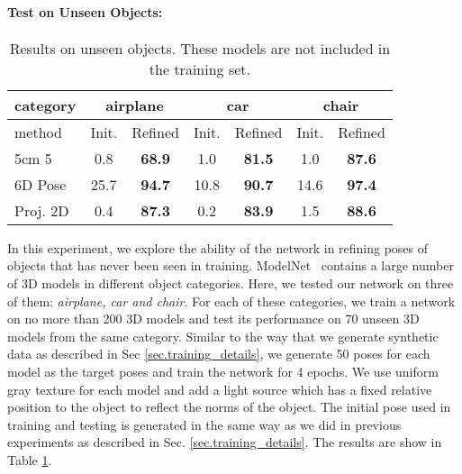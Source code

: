 \documentclass[twocolumn]{svjour3}
\begin{document}
\paragraph{Test on Unseen Objects:}

\begin{table}
\centering
\caption{Results on unseen objects. These models are not included in the training set.}
\small
\begin{tabular}{l|c|c|c|c|c|c}
\hline
category & \multicolumn{2}{c|}{airplane}& \multicolumn{2}{c|}{car}& \multicolumn{2}{c}{chair}\\
\hline
method  & Init. & Refined & Init. & Refined &Init. & Refined\\
\hline
5cm 5\degree	& 0.8 & \textbf{68.9} & 1.0 	& \textbf{81.5} & 1.0 	& \textbf{87.6} \\
6D Pose  & 25.7  & \textbf{94.7} & 10.8	& \textbf{90.7} & 14.6 & \textbf{97.4} \\
Proj. 2D & 0.4 & \textbf{87.3} & 0.2 	& \textbf{83.9} & 1.5	& \textbf{88.6} \\
\hline
\end{tabular}
\label{table.unseen_objects}
\end{table}

In this experiment, we explore the ability of the network in refining poses of objects that has never been seen in training. 
ModelNet~\citep{wu20153d} contains a large number of 3D models in different object categories. 
Here, we tested our network on three of them: \textit{airplane, car and chair}. For each of these categories, we train a network on no more than 200 3D models and test its performance on 70 unseen 3D models from the same category. Similar to the way that we generate synthetic data as described in Sec \ref{sec.training_details}, we generate 50 poses for each model as the target poses and train the network for 4 epochs. We use uniform gray texture for each model and add a light source which has a fixed relative position to the object to reflect the norms of the object. 
The initial pose used in training and testing is generated in the same way as we did in previous experiments as described in Sec. \ref{sec.training_details}. The results are show in Table \ref{table.unseen_objects}.
\end{document}
